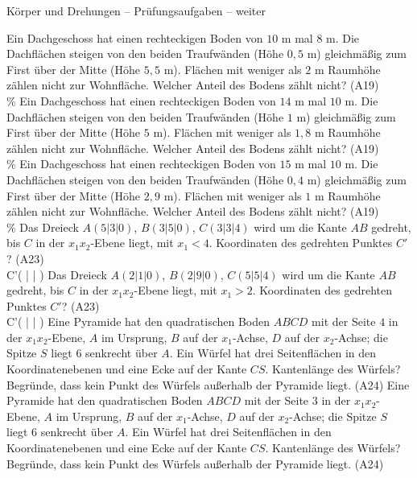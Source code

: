 \begin{aufgabe}{Körper und Drehungen – Prüfungsaufgaben – weiter}
\begin{teile}
\teil Ein Dachgeschoss hat einen rechteckigen Boden von $10$ m mal $8$ m. Die Dachflächen steigen von den beiden Traufwänden (Höhe $0{,}5$ m) gleichmäßig zum First über der Mitte (Höhe $5{,}5$ m). Flächen mit weniger als $2$ m Raumhöhe zählen nicht zur Wohnfläche. Welcher Anteil des Bodens zählt nicht? \hfill (A19) \\ \leerfeld \%
\teil Ein Dachgeschoss hat einen rechteckigen Boden von $14$ m mal $10$ m. Die Dachflächen steigen von den beiden Traufwänden (Höhe $1$ m) gleichmäßig zum First über der Mitte (Höhe $5$ m). Flächen mit weniger als $1{,}8$ m Raumhöhe zählen nicht zur Wohnfläche. Welcher Anteil des Bodens zählt nicht? \hfill (A19) \\ \leerfeld \%
\teil Ein Dachgeschoss hat einen rechteckigen Boden von $15$ m mal $10$ m. Die Dachflächen steigen von den beiden Traufwänden (Höhe $0{,}4$ m) gleichmäßig zum First über der Mitte (Höhe $2{,}9$ m). Flächen mit weniger als $1$ m Raumhöhe zählen nicht zur Wohnfläche. Welcher Anteil des Bodens zählt nicht? \hfill (A19) \\ \leerfeld \%
\teil Das Dreieck $A(5 | 3 | 0)$, $B(3 | 5 | 0)$, $C(3 | 3 | 4)$ wird um die Kante $AB$ gedreht, bis $C$ in der $x_1x_2$-Ebene liegt, mit $x_1 < 4$. Koordinaten des gedrehten Punktes $C'$? \hfill (A23) \\ C'( \leerfeld | \leerfeld | \leerfeld )
\teil Das Dreieck $A(2 | 1 | 0)$, $B(2 | 9 | 0)$, $C(5 | 5 | 4)$ wird um die Kante $AB$ gedreht, bis $C$ in der $x_1x_2$-Ebene liegt, mit $x_1 > 2$. Koordinaten des gedrehten Punktes $C'$? \hfill (A23) \\ C'( \leerfeld | \leerfeld | \leerfeld )
\teil Eine Pyramide hat den quadratischen Boden $ABCD$ mit der Seite $4$ in der $x_1x_2$-Ebene, $A$ im Ursprung, $B$ auf der $x_1$-Achse, $D$ auf der $x_2$-Achse; die Spitze $S$ liegt $6$ senkrecht über $A$. Ein Würfel hat drei Seitenflächen in den Koordinatenebenen und eine Ecke auf der Kante $CS$. Kantenlänge des Würfels? Begründe, dass kein Punkt des Würfels außerhalb der Pyramide liegt. \hfill (A24)
\teil Eine Pyramide hat den quadratischen Boden $ABCD$ mit der Seite $3$ in der $x_1x_2$-Ebene, $A$ im Ursprung, $B$ auf der $x_1$-Achse, $D$ auf der $x_2$-Achse; die Spitze $S$ liegt $6$ senkrecht über $A$. Ein Würfel hat drei Seitenflächen in den Koordinatenebenen und eine Ecke auf der Kante $CS$. Kantenlänge des Würfels? Begründe, dass kein Punkt des Würfels außerhalb der Pyramide liegt. \hfill (A24)

\end{teile}
\end{aufgabe}
